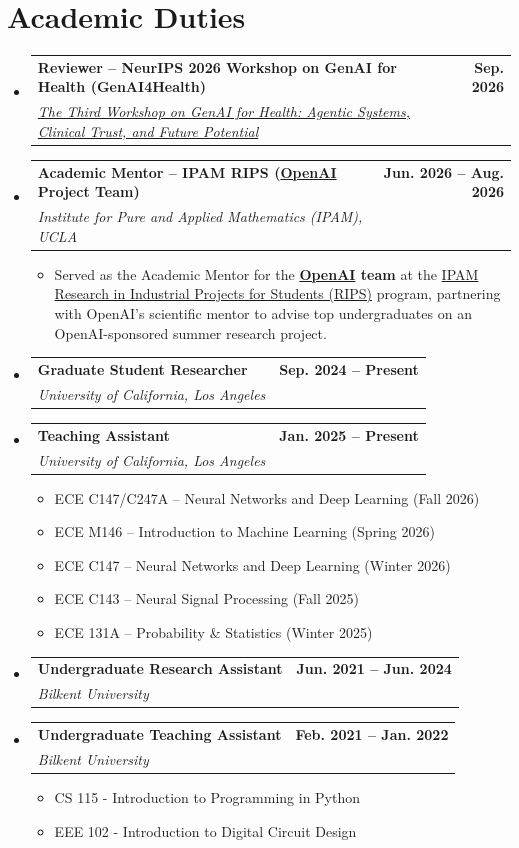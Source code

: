 \documentclass[letterpaper,11pt]{article}
\makeatletter
\newcommand{\resumeItem}[1]{
  \item\small{
    {#1 \vspace{1.2pt}}
  }
}
\newcommand{\resumeSubheading}[4]{
  \vspace{5pt}\item
    \begin{tabular*}{1.0\textwidth}[t]{l@{\extracolsep{\fill}}r}
      \textbf{#1} & \textbf{\small #2} \\
      \emph{\small#3} & \emph{\small #4} \\
    \end{tabular*}\vspace{-5pt}
}
\newcommand{\resumeSubHeadingListStart}{\begin{itemize}[leftmargin=0.0in, label={}]}
\newcommand{\resumeSubHeadingListEnd}{\end{itemize}}
\newcommand{\resumeItemListStart}{\begin{itemize}}
\newcommand{\resumeItemListEnd}{\end{itemize}\vspace{-5pt}}
\makeatother
\begin{document}
\section{Academic Duties}
\resumeSubHeadingListStart
    \resumeSubheading{Reviewer -- NeurIPS 2026 Workshop on GenAI for Health (GenAI4Health)}{Sep. 2026}{\href{https://aihealth.ischool.utexas.edu/GenAI4HealthNeurips2026/}{The Third Workshop on GenAI for Health: Agentic Systems, Clinical Trust, and Future Potential}}{}
    \resumeSubheading{Academic Mentor -- IPAM RIPS (\href{https://openai.com/}{OpenAI} Project Team)}{Jun. 2026 -- Aug. 2026}{Institute for Pure and Applied Mathematics (IPAM), UCLA}{}
    \resumeItemListStart
    \resumeItem{Served as the Academic Mentor for the \textbf{\href{https://openai.com/}{OpenAI} team} at the \href{https://www.ipam.ucla.edu/programs/student-research-programs/research-in-industrial-projects-for-students-rips/}{IPAM Research in Industrial Projects for Students (RIPS)} program, partnering with OpenAI's scientific mentor to advise top undergraduates on an OpenAI-sponsored summer research project.} \\
    \resumeItemListEnd
    \resumeSubheading{Graduate Student Researcher}{Sep. 2024 -- Present}{University of California, Los Angeles}{}
    \resumeSubheading{Teaching Assistant}{Jan. 2025 -- Present}{University of California, Los Angeles}{}
    \resumeItemListStart
    \resumeItem{ECE C147/C247A -- Neural Networks and Deep Learning (Fall 2026)} \\
    \resumeItem{ECE M146 -- Introduction to Machine Learning (Spring 2026)} \\
    \resumeItem{ECE C147 -- Neural Networks and Deep Learning (Winter 2026)} \\
    \resumeItem{ECE C143 -- Neural Signal Processing (Fall 2025)} \\
    \resumeItem{ECE 131A -- Probability \& Statistics (Winter 2025)} \\
    \resumeItemListEnd
    \resumeSubheading{Undergraduate Research Assistant}{Jun. 2021 -- Jun. 2024}{Bilkent University}{}

    \resumeSubheading{Undergraduate Teaching Assistant}{Feb. 2021 -- Jan. 2022}{Bilkent University}{}
    \resumeItemListStart
    \resumeItem{CS 115 - Introduction to Programming in Python} \\
    \resumeItem{EEE 102 - Introduction to Digital Circuit Design } \\
    \resumeItemListEnd

\resumeSubHeadingListEnd
\vspace{-8mm}
\end{document}
